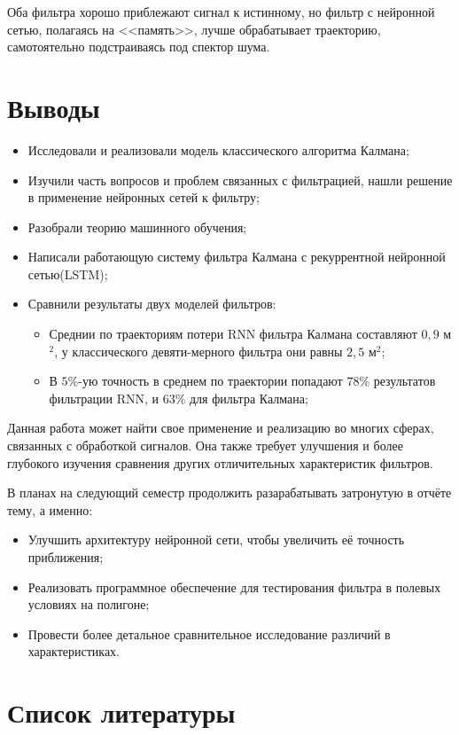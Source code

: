 \documentclass[a4paper,11pt]{article} %
\begin{document}
Оба фильтра хорошо приблежают сигнал к истинному, но фильтр с нейронной сетью, полагаясь на <<память>>,  лучше обрабатывает траекторию, самотоятельно подстраиваясь под спектор шума.


\newpage
\section{Выводы}

\begin{itemize}
\item Исследовали и реализовали модель классического алгоритма  Калмана;
\item Изучили часть вопросов и проблем связанных с фильтрацией,   нашли решение в применение нейронных сетей к фильтру;
\item Разобрали теорию машинного обучения;
\item Написали работающую систему фильтра Калмана с рекуррентной нейронной сетью(LSTM);
\item Сравнили результаты двух моделей фильтров: 
\begin{itemize}
\item Среднии по траекториям потери RNN фильтра Калмана составляют $0,9$ м$^2$,  у классического девяти-мерного фильтра они равны $2,5$ м$^2$;
\item В $5\%$-ую точность в среднем по траектории попадают $78\%$ результатов фильтрации RNN,  и $63\%$ для фильтра Калмана;
\end{itemize}
\end{itemize}

Данная работа может найти свое применение и реализацию во многих сферах, связанных с обработкой сигналов. Она также требует улучшения и более глубокого изучения сравнения других отличительных характеристик фильтров.  

В планах на следующий семестр продолжить разарабатывать затронутую в отчёте тему, а именно:
\begin{itemize}
\item Улучшить архитектуру нейронной сети, чтобы увеличить её точность приближения;
\item Реализовать программное обеспечение для тестирования фильтра в полевых условиях на полигоне;
\item Провести более детальное сравнительное исследование различий в характеристиках.
\end{itemize}
\newpage
\section{Список литературы}
\renewcommand{\refname}{ }
\end{document}
